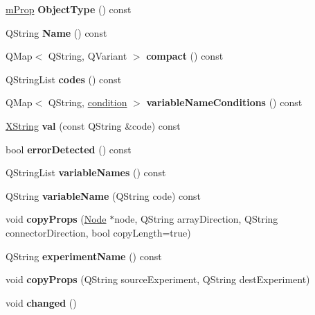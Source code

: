 \begin{DoxyCompactItemize}
\hyperlink{classm_prop}{m\+Prop} {\bfseries Object\+Type} () const
\item 
\mbox{\label{class_edge_aa9b9903228d96361f83990048b3ad579}} 
Q\+String {\bfseries Name} () const
\item 
\mbox{\label{class_edge_aa4c59b2fb9a5eff1a79505755996eacf}} 
Q\+Map$<$ Q\+String, Q\+Variant $>$ {\bfseries compact} () const
\item 
\mbox{\label{class_edge_a77c990e1db722aaa8c04e6d735ff9e5e}} 
Q\+String\+List {\bfseries codes} () const
\item 
\mbox{\label{class_edge_a91d6019e76a30009c91734e49d9c4b1e}} 
Q\+Map$<$ Q\+String, \hyperlink{structcondition}{condition} $>$ {\bfseries variable\+Name\+Conditions} () const
\item 
\mbox{\label{class_edge_a18ff854057a11366e0a22e7dc3f64eb8}} 
\hyperlink{class_x_string}{X\+String} {\bfseries val} (const Q\+String \&code) const
\item 
\mbox{\label{class_edge_a70f5d23a5de35760fd21e9f94958cf35}} 
bool {\bfseries error\+Detected} () const
\item 
\mbox{\label{class_edge_abdb9c0bb888418c38ef26f00f535614e}} 
Q\+String\+List {\bfseries variable\+Names} () const
\item 
\mbox{\label{class_edge_a584202c775d3da6bfe9f911b3b67b4e4}} 
Q\+String {\bfseries variable\+Name} (Q\+String code) const
\item 
\mbox{\label{class_edge_a7ba25639eeeb780b6b955b7ad48fb84a}} 
void {\bfseries copy\+Props} (\hyperlink{class_node}{Node} $\ast$node, Q\+String array\+Direction, Q\+String connector\+Direction, bool copy\+Length=true)
\item 
\mbox{\label{class_edge_a19a1f35d678b8ee14269072defa0ed21}} 
Q\+String {\bfseries experiment\+Name} () const
\item 
\mbox{\label{class_edge_a7535592e8a83c71cd9bc3666cd2535d2}} 
void {\bfseries copy\+Props} (Q\+String source\+Experiment, Q\+String dest\+Experiment)
\item 
\mbox{\label{class_edge_a21fbc0200f149f204757be6ae50915d0}} 
void {\bfseries changed} ()
\end{DoxyCompactItemize}
